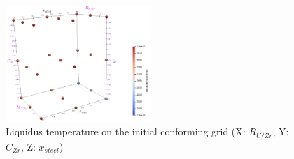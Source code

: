 \documentclass[11pt]{article}\usepackage{geometry} \geometry{letterpaper, margin=25.4mm}
\begin{document}
\begin{figure}[H]
\centering
 \centering \includegraphics[width=0.49\textwidth]{figures/CalphadBasedEOSTest/TabulatedBases/Tab0_B.png} 
\caption{{Liquidus temperature on the initial conforming grid (X: $R_{U/Zr}$, Y: $C_{Zr}$, Z: $x_{steel}$})} \label{fig:Tab0} 
\end{figure}
\end{document}
